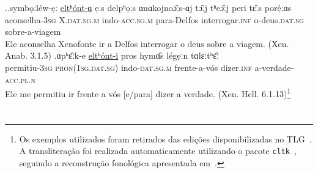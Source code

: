 \documentclass[a4paper,article,12pt,oneside]{memoir}
\begin{document}
\ex.\label{gloss:attrac}\ag.\label{elthonta}symbọːléw-ẹː  \uline{eltʰónt-ɑ} {ẹːs delpʰọːs} ɑnɑkojnoɔ̂ːs-ɑj {tɔ̂ːj tʰeɔ̂ːj} {peri tɛ̂ːs porẹ́ːɑs}\\
aconselha-\textsc{3sg} X.\textsc{dat.sg.m} indo-\textsc{acc.sg.m} para-Delfos interrogar.\textsc{inf} o-deus.\textsc{dat.sg} sobre-a-viagem\\
Ele aconselha Xenofonte ir a Delfos interrogar o deus sobre a viagem. (Xen. Anab. 3.1.5)
\bg.\label{elthonti}ɑpʰɛ̂ːk-e  \uline{eltʰónt-i} {pros hymɑ̂s} légẹːn tɑlɛːtʰɛ̂ː\\
permitiu-\textsc{3sg} \textsc{pron{(1sg.dat.sg)}} indo-\textsc{dat.sg.m} frente-a-vós dizer.\textsc{inf} a-verdade-\textsc{acc.pl.n}\\
Ele me permitiu ir frente a vós [e\slash{}para] dizer a verdade.  (Xen. Hell. 6.1.13)\footnote{Os exemplos utilizados foram retirados das edições disponibilizadas no TLG~\cite{tlg}. A transliteração foi realizada automaticamente utilizando o pacote \texttt{cltk}~\cite{cltk}, seguindo a reconstrução fonológica apresentada em~\textcite{Probert2010}.}

\section{}
\end{document}

